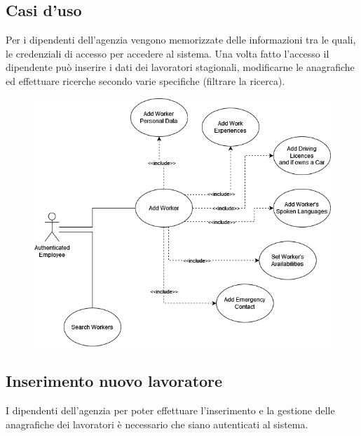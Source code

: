 \documentclass[a4paper, oneside, 12pt]{article}
\begin{document}
\newpage
\subsection{Casi d'uso}
Per i dipendenti dell'agenzia vengono memorizzate delle informazioni tra le quali, le credenziali di accesso 
per accedere al sistema. Una volta fatto l'accesso il dipendente può inserire i dati dei lavoratori stagionali,
modificarne le anagrafiche ed effettuare ricerche secondo varie specifiche (filtrare la ricerca). 

\begin{figure}[h!]
	\centering
	\includegraphics[width = 12 cm]{images/casiduso}
	\label{fig:casi d'uso}
\end{figure}

\newpage

\subsection{Inserimento nuovo lavoratore}
I dipendenti dell'agenzia per poter effettuare l'inserimento e la gestione delle anagrafiche dei lavoratori 
è necessario che siano autenticati al sistema. \\

\end{document}

